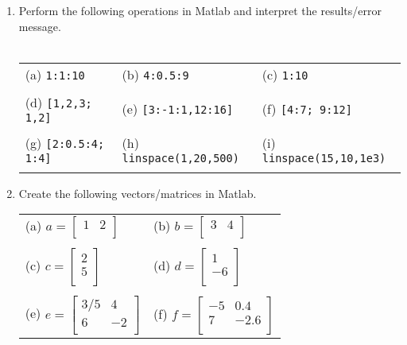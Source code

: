 \documentclass{pass}
\begin{document}
\begin{enumerate}[resume]
\item Perform the following operations in Matlab and interpret the results/error message.\\ \\
\begin{tabularx}{\textwidth}{XXX}
(a) \texttt{1:1:10} & (b) \texttt{4:0.5:9} & (c) \texttt{1:10} \\ \\
(d) \texttt{[1,2,3; 1,2]} & (e) \texttt{[3:-1:1,12:16]} & (f) \texttt{[4:7; 9:12]} \\ \\
(g) \texttt{[2:0.5:4; 1:4]} & (h) \texttt{linspace(1,20,500)} & (i) \texttt{linspace(15,10,1e3)} \\ \\
\end{tabularx}

\item \label{q:define}Create the following vectors/matrices in Matlab.\\
\begin{tabularx}{\textwidth}{XX}
(a) $a = \left[ {\begin{array}{cc}
		 1 & 2 \\
	\end{array} } \right]$ & 
(b) $b = \left[ {\begin{array}{cc}
		 3 & 4 \\
	\end{array} } \right]$ \\ \\
(c) $c = \left[ {\begin{array}{c}
		 2 \\
		 5 \\
	\end{array} } \right]$ & 
(d) $d = \left[ {\begin{array}{c}
		 1 \\
		 -6 \\
	\end{array} } \right]$\\ \\
(e) $e = \left[ {\begin{array}{cc}
		 3/5 & 4 \\
		 6 & -2 \\
	\end{array} } \right]$ & 
(f) $f = \left[ {\begin{array}{cc}
		 -5 & 0.4 \\
		 7 & -2.6 \\
	\end{array} } \right]$
\end{tabularx}


\end{enumerate}
\end{document}
